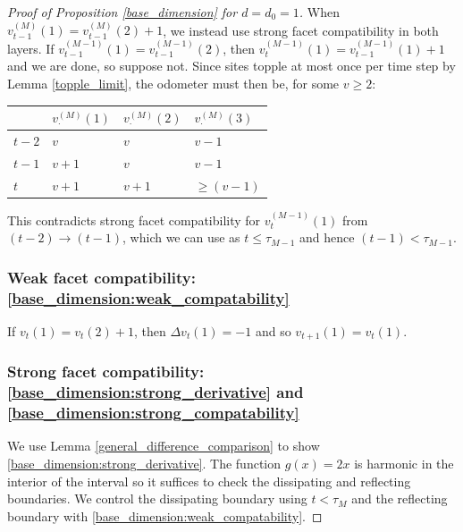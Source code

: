 \documentclass[12pt]{amsart}
\begin{document}
\begin{proof}[Proof of Proposition \ref{base_dimension} for $d=d_0 = 1$]
		When $v_{t-1}^{(M)}(1) = v_{t-1}^{(M)}(2) + 1$, we instead use strong facet compatibility 
		in both layers. If $v_{t-1}^{(M-1)}(1) = v_{t-1}^{(M-1)}(2)$, then $v_{t}^{(M-1)}(1) = v_{t-1}^{(M-1)}(1) + 1$ and we are done, so suppose not. Since sites topple at most once per time step by Lemma \ref{topple_limit}, 
		the odometer must then be,  for some $v \geq 2$:
		\begin{center}
			\begin{tabular}{l | l | l | l }
				& $v_{\cdot}^{(M)}(1)$ & $v_{\cdot}^{(M)}(2)$ & $v_{\cdot}^{(M)}(3)$ \\  \hline
				$t-2$ & $v$ & $v$ & $v-1$    \\
				$t-1$  & $v+1$ & $v$  & $v-1$  \\   
				$t$  & $v+1$ & $v+1$ & $\geq (v-1)$
			\end{tabular}
		\end{center}
		This contradicts strong facet compatibility for $v_t^{(M-1)}(1)$ from $(t-2) \to (t-1)$, which 
		we can use as $t \leq \tau_{M-1}$ and hence $(t-1) < \tau_{M-1}$.
		
		\subsubsection*{Weak facet compatibility: \eqref{base_dimension:weak_compatability}}
		If $v_t(1) = v_t(2) + 1$, then $\Delta v_t(1) = -1$ and so $v_{t+1}(1) = v_{t}(1)$. 
		
		
		
		
		
		\subsubsection*{Strong facet compatibility: \eqref{base_dimension:strong_derivative} and \eqref{base_dimension:strong_compatability}} 
		
		We use Lemma \ref{general_difference_comparison} to show \eqref{base_dimension:strong_derivative}.
		The function $g(x) = 2 x$ is harmonic in the interior of the interval so it suffices to check 
		the dissipating and reflecting boundaries. We control the dissipating boundary using $t < \tau_M$
		and the reflecting boundary with \eqref{base_dimension:weak_compatability}. 
		

\end{proof}
\end{document}
